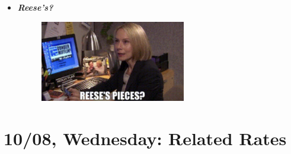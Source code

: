 \documentclass[11pt,letterpaper]{article}
\begin{document}
\begin{itemize}
\item {\bfseries\itshape Reese's?}
	\begin{figure}[H]
	\centering
	\includegraphics[width=0.60\textwidth]{images/pieces.png}
	\end{figure}
\end{itemize}

\newpage
\section*{10/08, Wednesday: Related Rates\label{10-08}}
\end{document}
